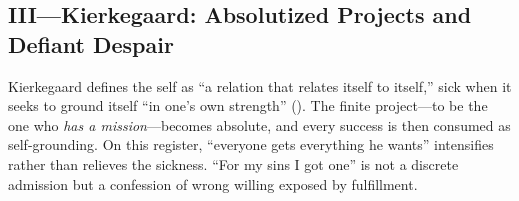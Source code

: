 \subsection*{III—Kierkegaard: Absolutized Projects and Defiant Despair}
\label{ssec:iii-kierkegaard}
Kierkegaard defines the self as “a relation that relates itself to itself,” sick when it seeks to ground itself “in one’s own strength” (\parencite[pp.~49, 69--73]{KierkegaardSUD1980}). The finite project—to be the one who \emph{has a mission}—becomes absolute, and every success is then consumed as self-grounding. On this register, “everyone gets everything he wants” intensifies rather than relieves the sickness. “For my sins I got one” is not a discrete admission but a confession of wrong willing exposed by fulfillment.
